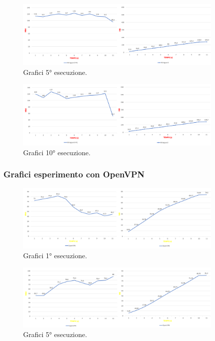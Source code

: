 \begin{figure}[h] \includegraphics[width=0.9\textwidth] {Tesi magistrale/capitoli/images/60.png}
\centering
\caption{Grafici 5° esecuzione.}
\end{figure}

\begin{figure}[h] \includegraphics[width=0.9\textwidth] {Tesi magistrale/capitoli/images/61.png}
\centering
\caption{Grafici 10° esecuzione.}
\end{figure}

\newpage
\subsubsection{Grafici esperimento con OpenVPN}

\begin{figure}[h] \includegraphics[width=0.9\textwidth] {Tesi magistrale/capitoli/images/62.png}
\centering
\caption{Grafici 1° esecuzione.}
\end{figure}

\begin{figure}[h] \includegraphics[width=0.9\textwidth] {Tesi magistrale/capitoli/images/63.png}
\centering
\caption{Grafici 5° esecuzione.}
\end{figure}

